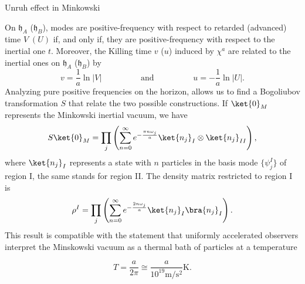 \documentclass[final, border=3pt]{beamer}
\newlength{\onecolwid}
\begin{document}
\begin{frame}[t]
\begin{columns}[t]
\begin{column}{\onecolwid}
\begin{block}{Unruh effect in Minkowski}
\begin{figure}[h]
\begin{tikzpicture}[scale=8]
                        \end{tikzpicture}
                    \end{figure}
                    On \(\mathfrak{h}_A\) (\(\mathfrak{h}_B\)), modes are positive-frequency with respect to retarded (advanced) time \(V\;(U)\) if, and only if, they are positive-frequency with respect to the inertial one \(t\). Moreover, the Killing time \(v\) (\(u\)) induced by \(\chi^a\) are related to the inertial ones on \(\mathfrak{h}_A\) (\(\mathfrak{h}_B\)) by
                    \begin{equation}
                        v=\frac{1}{a}\ln{\lvert V\rvert}\hspace{2cm}\text{and}\hspace{2cm}u=-\frac{1}{a}\ln{\lvert U\rvert}.
                    \end{equation}
                    Analyzing pure positive frequencies on the horizon, allows us to find a Bogoliubov transformation \(S\) that relate the two possible constructions. If \(\ket{0}_M\) represents the Minkowski inertial vacuum, we have
                    \begin{equation}
                        S\ket{0}_M=\prod_{j}\left(\sum_{n=0}^{\infty}e^{-\frac{\pi n\omega_j}{a}}\ket{n_j}_I\otimes\ket{n_j}_{II}\right),
                    \end{equation}
                    where \(\ket{n_j}_I\) represents a state with \(n\) particles in the basis mode \(\{\psi^{I}_{j}\}\) of region I, the same stands for region II. The density matrix restricted to region I is
                    \begin{equation}
                        \rho^I=\prod_j\left(\sum_{n=0}^{\infty}e^{-\frac{2n\omega_j}{a}}\ket{n_j}_I\bra{n_j}_I\right).
                    \end{equation}
                    This result is compatible with the statement that uniformly accelerated observers interpret the Minskowski vacuum as a thermal bath of particles at a temperature

                    \begin{equation}
                        T=\frac{a}{2\pi}\cong \frac{a}{10^{19}\unit{\meter\per\second^2}}\unit{\kelvin}.
                    \end{equation}
                \end{block}

            \end{column}
                  

\end{columns}
\end{frame}
\end{document}
